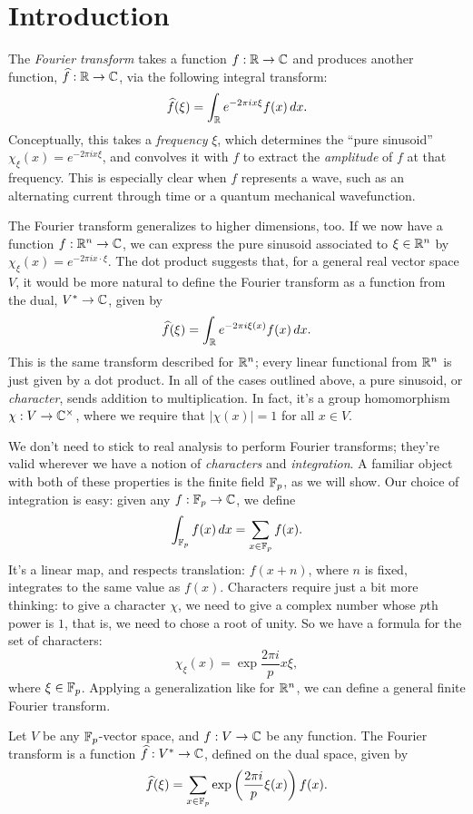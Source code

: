 \section{Introduction}\label{sec:intro}

The \emph{Fourier transform} takes a function $f:\mathbb{R}\to\mathbb{C}$ and produces another
function, $\widehat{f}:\mathbb{R}\to\mathbb{C}$, via the following integral transform:
\[ \widehat{f}(\xi) = \int_{\mathbb{R}} e^{-2\pi i x \xi} f(x)\, dx. \]
Conceptually, this takes a \emph{frequency} $\xi$, which determines the ``pure sinusoid''
$\chi_\xi (x) = e^{-2\pi i x \xi}$, and convolves it with $f$ to extract the \emph{amplitude} of $f$ 
at that frequency. This is especially clear when $f$ represents a wave, such as an alternating
current through time or a quantum mechanical wavefunction. 

The Fourier transform generalizes to higher dimensions, too. If we now have a function
$f:\mathbb{R}^n\to\mathbb{C}$, we can express the pure sinusoid associated to $\xi\in\mathbb{R}^n$ by 
$\chi_\xi (x) = e^{-2\pi i x\cdot\xi}$. The dot product suggests that, for a general real vector space $V$, it would be more natural to define the 
Fourier transform as a function from the dual, $V^* \to \mathbb{C}$, given by
\[ \widehat{f}(\xi) = \int_{\mathbb{R}} e^{-2\pi i \xi(x)} f(x)\, dx. \]
This is the same transform described for $\mathbb{R}^n$; every linear functional from $\mathbb{R}^n$ is
just given by a dot product. In all of the cases outlined above, a pure sinusoid, or
\emph{character}, sends addition to multiplication. In fact, it's a group homomorphism 
$\chi:V \to \mathbb{C}^\times$, where we require that $|\chi(x)| = 1$ for all $x\in V$.

We don't need to stick to real analysis to perform Fourier transforms; they're
valid wherever we have a notion of \emph{characters}
and \emph{integration}. A familiar object with both of these properties is the finite field
$\mathbb{F}_p$, as we will show. Our choice of integration is easy: given any $f:\mathbb{F}_p\to\mathbb{C}$, we define
\[ \int_{\mathbb{F}_p} f(x)\, dx = \sum_{x\in\mathbb{F}_p} f(x). \]
It's a linear map, and respects translation: $f(x + n)$, where $n$ is fixed, integrates to the 
same value as $f(x)$. Characters require just a bit more thinking: to give a character 
$\chi$, we need to give a complex number whose $p$th power is $1$, that is, we need
to chose a root of unity. So we have a formula for the set of characters:
\[ \chi_\xi(x) = \exp {\frac{2\pi i}{p} x \xi}, \]
where $\xi\in\mathbb{F}_p$. Applying a generalization like for $\mathbb{R}^n$, we can define a general
finite Fourier transform.
\begin{defn}\label{defn:intro-FpFT}
    Let $V$ be any $\mathbb{F}_p$-vector space, and $f:V\to \mathbb{C}$ be any function. The Fourier
    transform is a function $\widehat{f}:V^*\to\mathbb{C}$, defined on the dual space, given by
    \[ \widehat{f}(\xi) = 
        \sum_{x\in\mathbb{F}_p} \exp \left(\frac{2\pi i}{p} \xi(x)\right) f(x). \]
\end{defn}

